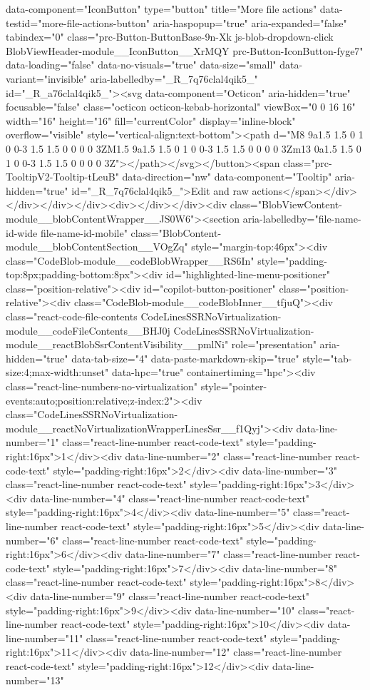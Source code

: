 {{{{{{{data-component="IconButton" type="button" title="More file actions" data-testid="more-file-actions-button" aria-haspopup="true" aria-expanded="false" tabindex="0" class="prc-Button-ButtonBase-9n-Xk js-blob-dropdown-click BlobViewHeader-module__IconButton__XrMQY prc-Button-IconButton-fyge7" data-loading="false" data-no-visuals="true" data-size="small" data-variant="invisible" aria-labelledby="_R_7q76clal4qik5_" id="_R_a76clal4qik5_"><svg data-component="Octicon" aria-hidden="true" focusable="false" class="octicon octicon-kebab-horizontal" viewBox="0 0 16 16" width="16" height="16" fill="currentColor" display="inline-block" overflow="visible" style="vertical-align:text-bottom"><path d="M8 9a1.5 1.5 0 1 0 0-3 1.5 1.5 0 0 0 0 3ZM1.5 9a1.5 1.5 0 1 0 0-3 1.5 1.5 0 0 0 0 3Zm13 0a1.5 1.5 0 1 0 0-3 1.5 1.5 0 0 0 0 3Z"></path></svg></button><span class="prc-TooltipV2-Tooltip-tLeuB" data-direction="nw" data-component="Tooltip" aria-hidden="true" id="_R_7q76clal4qik5_">Edit and raw actions</span></div></div></div></div><div></div></div><div class="BlobViewContent-module__blobContentWrapper__JS0W6"><section aria-labelledby="file-name-id-wide file-name-id-mobile" class="BlobContent-module__blobContentSection__VOgZq" style="margin-top:46px"><div class="CodeBlob-module__codeBlobWrapper__RS6In" style="padding-top:8px;padding-bottom:8px"><div id="highlighted-line-menu-positioner" class="position-relative"><div id="copilot-button-positioner" class="position-relative"><div class="CodeBlob-module__codeBlobInner__tfjuQ"><div class="react-code-file-contents CodeLinesSSRNoVirtualization-module__codeFileContents__BHJ0j CodeLinesSSRNoVirtualization-module__reactBlobSsrContentVisibility__pmlNi" role="presentation" aria-hidden="true" data-tab-size="4" data-paste-markdown-skip="true" style="tab-size:4;max-width:unset" data-hpc="true" containertiming="hpc"><div class="react-line-numbers-no-virtualization" style="pointer-events:auto;position:relative;z-index:2"><div class="CodeLinesSSRNoVirtualization-module__reactNoVirtualizationWrapperLinesSsr__f1Qyj"><div data-line-number="1" class="react-line-number react-code-text" style="padding-right:16px">1</div><div data-line-number="2" class="react-line-number react-code-text" style="padding-right:16px">2</div><div data-line-number="3" class="react-line-number react-code-text" style="padding-right:16px">3</div><div data-line-number="4" class="react-line-number react-code-text" style="padding-right:16px">4</div><div data-line-number="5" class="react-line-number react-code-text" style="padding-right:16px">5</div><div data-line-number="6" class="react-line-number react-code-text" style="padding-right:16px">6</div><div data-line-number="7" class="react-line-number react-code-text" style="padding-right:16px">7</div><div data-line-number="8" class="react-line-number react-code-text" style="padding-right:16px">8</div><div data-line-number="9" class="react-line-number react-code-text" style="padding-right:16px">9</div><div data-line-number="10" class="react-line-number react-code-text" style="padding-right:16px">10</div><div data-line-number="11" class="react-line-number react-code-text" style="padding-right:16px">11</div><div data-line-number="12" class="react-line-number react-code-text" style="padding-right:16px">12</div><div data-line-number="13" }}}}}}}
